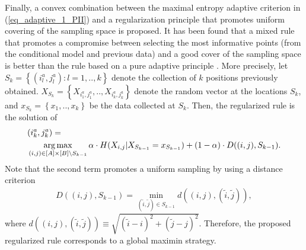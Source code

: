 
Finally, a convex combination between the maximal entropy adaptive criterion in (\ref{eq_adaptive_1_PII}) and a regularization principle that promotes uniform covering of the sampling space is proposed. It has been found that a mixed rule that promotes a compromise between selecting the most informative points (from the conditional model and previous data) and a good cover of the sampling space is better than the rule based on a pure adaptive principle \citep{Santibanez2019_a}.  
More precisely, let $S_{k} = \left\{(i^a_l,j^a_l): l=1,..,k\right\}$ denote the collection of $k$ positions previously obtained.  $X_{S_{k}} = \left\{ X_{i^a_1,j^a_1},.., X_{i^a_{k},j^a_{k}} \right\}$ denote the random vector at the locations $S_{k}$, and $x_{S_{k}} = \left\{ x_1,.., x_{k} \right\}$ be the data collected at $S_{k}$. Then, the regularized rule is the solution of
\begin{align}\label{eq_subsec_ObjectiveFunction_1_PII}
&(i^a_k,j^a_k) =\nonumber\\ 
& \operatorname*{arg\,max}_{(i,j)\in [A]\times [B] \setminus S_{k-1}} \alpha \cdot  H(X_{i,j}| X_{S_{k-1}} = x_{S_{k-1}} )  + (1 - \alpha) \cdot D((i,j), S_{k-1}).
\end{align}
Note that the second term promotes a uniform sampling by using a distance criterion %
\begin{align}\label{eq_subsec_ObjectiveFunction_2_PII}
D(({i,j}),{S_{k-1}}) = \min_{({\tilde{i},\tilde{j}}) \in S_{k-1}}  d(({i,j}), ({\tilde{i},\tilde{j}})),
\end{align}
where $d(({i,j}), ({\tilde{i},\tilde{j}})) \equiv \sqrt{(\tilde{i}-i)^2+ (\tilde{j}-j)^2}$. Therefore, the proposed regularized rule corresponds to a global maximin strategy.


